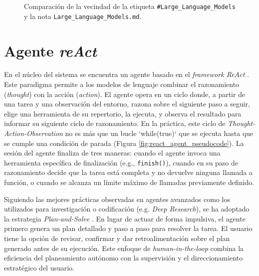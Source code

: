 \begin{figure}[h!]
\begin{subfigure}[b]{0.48\textwidth}
        \label{fig:llm_note}
    \end{subfigure}
    \caption{Comparación de la vecindad de la etiqueta \texttt{\#Large\_Language\_Models} y la nota \texttt{Large\_Language\_Models.md}.}
    \label{fig:obsidian_force_graph_example}
\end{figure}

\section{Agente \textit{reAct}}
En el núcleo del sistema se encuentra un agente basado en el \textit{framework ReAct} \parencite{yaoReActSynergizingReasoning2023}. Este paradigma permite a los modelos de lenguaje combinar el razonamiento (\textit{thought}) con la acción (\textit{action}). El agente opera en un ciclo donde, a partir de una tarea y una observación del entorno, razona sobre el siguiente paso a seguir, elige una herramienta de su repertorio, la ejecuta, y observa el resultado para informar su siguiente ciclo de razonamiento. En la práctica, este ciclo de \textit{Thought-Action-Observation} no es más que un bucle `while(true)` que se ejecuta hasta que se cumple una condición de parada (Figura \ref{fig:react_agent_pseudocode}). La sesión del agente finaliza de tres maneras: cuando el agente invoca una herramienta específica de finalización (e.g., \texttt{finish()}), cuando en su paso de razonamiento decide que la tarea está completa y no devuelve ninguna llamada a función, o cuando se alcanza un límite máximo de llamadas previamente definido.

Siguiendo las mejores prácticas observadas en agentes avanzados como los utilizados para investigación o codificación (e.g. \textit{Deep Research}), se ha adoptado la estrategia \textit{Plan-and-Solve} \parencite{wangPlanandSolvePromptingImproving2023}. En lugar de actuar de forma impulsiva, el agente primero genera un plan detallado y paso a paso para resolver la tarea. El usuario tiene la opción de revisar, confirmar y dar retroalimentación sobre el plan generado antes de su ejecución. Este enfoque de \textit{human-in-the-loop} combina la eficiencia del planeamiento autónomo con la supervisión y el direccionamiento estratégico del usuario.

